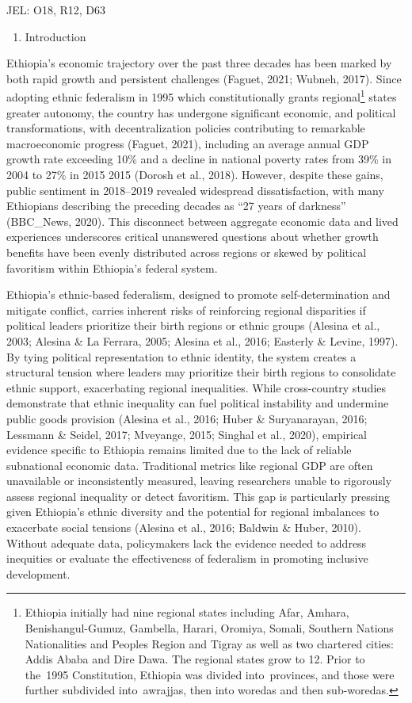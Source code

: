 JEL: O18, R12, D63

\begin{enumerate}
\def\labelenumi{\arabic{enumi}.}
\item
  Introduction
\end{enumerate}

Ethiopia's economic trajectory over the past three decades has been
marked by both rapid growth and persistent challenges (Faguet, 2021;
Wubneh, 2017). Since adopting ethnic federalism in 1995 which
constitutionally grants regional\footnote{Ethiopia initially had nine
  regional states including Afar, Amhara, Benishangul-Gumuz, Gambella,
  Harari, Oromiya, Somali, Southern Nations Nationalities and
  People\textquotesingle s Region and Tigray as well as two chartered
  cities: Addis Ababa and Dire Dawa. The regional states grow to 12.
  Prior to the~1995 Constitution, Ethiopia was divided into~provinces,
  and those were further subdivided into~awrajjas, then into woredas and
  then sub-woredas.} states greater autonomy, the country has undergone
significant economic, and political transformations, with
decentralization policies contributing to remarkable macroeconomic
progress (Faguet, 2021), including an average annual GDP growth rate
exceeding 10\% and a decline in national poverty rates from 39\% in 2004
to 27\% in 2015 2015 (Dorosh et al., 2018). However, despite these
gains, public sentiment in 2018--2019 revealed widespread
dissatisfaction, with many Ethiopians describing the preceding decades
as ``27 years of darkness'' (BBC\_News, 2020). This disconnect between
aggregate economic data and lived experiences underscores critical
unanswered questions about whether growth benefits have been evenly
distributed across regions or skewed by political favoritism within
Ethiopia's federal system.

Ethiopia's ethnic-based federalism, designed to promote
self-determination and mitigate conflict, carries inherent risks of
reinforcing regional disparities if political leaders prioritize their
birth regions or ethnic groups (Alesina et al., 2003; Alesina \& La
Ferrara, 2005; Alesina et al., 2016; Easterly \& Levine, 1997). By tying
political representation to ethnic identity, the system creates a
structural tension where leaders may prioritize their birth regions to
consolidate ethnic support, exacerbating regional inequalities. While
cross-country studies demonstrate that ethnic inequality can fuel
political instability and undermine public goods provision (Alesina et
al., 2016; Huber \& Suryanarayan, 2016; Lessmann \& Seidel, 2017;
Mveyange, 2015; Singhal et al., 2020), empirical evidence specific to
Ethiopia remains limited due to the lack of reliable subnational
economic data. Traditional metrics like regional GDP are often
unavailable or inconsistently measured, leaving researchers unable to
rigorously assess regional inequality or detect favoritism. This gap is
particularly pressing given Ethiopia's ethnic diversity and the
potential for regional imbalances to exacerbate social tensions (Alesina
et al., 2016; Baldwin \& Huber, 2010). Without adequate data,
policymakers lack the evidence needed to address inequities or evaluate
the effectiveness of federalism in promoting inclusive development.

